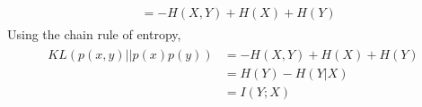 \documentclass{myhw}
\begin{document}
\begin{homeworkProblem}
\begin{homeworkSection}
\begin{gather*}
\begin{aligned}
&= -H(X, Y) + H(X) + H(Y) 
\end{aligned}
\end{gather*}
Using the chain rule of entropy,
\begin{gather*}
\begin{aligned}
KL(p(x, y)||p(x)p(y)) &= -H(X, Y) + H(X) + H(Y) \\ 
&= H(Y) - H(Y|X) \\
&= I(Y;X)
\end{aligned}
\end{gather*}
\end{homeworkSection}
\end{homeworkProblem}
\end{document}

